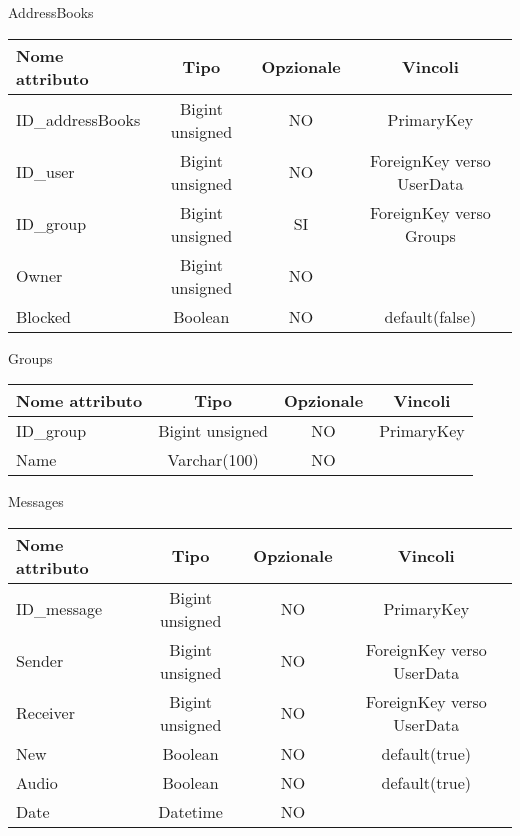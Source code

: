 \begin{center}
AddressBooks

\begin{center}
\begin{tabular}{lccc}
\toprule
Nome attributo & Tipo & Opzionale & Vincoli\\
\midrule
ID\_addressBooks & Bigint unsigned & NO & PrimaryKey\\
ID\_user & Bigint unsigned & NO & ForeignKey verso UserData\\
ID\_group & Bigint unsigned & SI & ForeignKey verso Groups\\
Owner & Bigint unsigned & NO & \\
Blocked & Boolean & NO & default(false)\\
\bottomrule
\end{tabular}
\end{center}

Groups

\begin{center}
\begin{tabular}{lccc}
\toprule
Nome attributo & Tipo & Opzionale & Vincoli\\
\midrule
ID\_group & Bigint unsigned & NO & PrimaryKey\\
Name & Varchar(100) & NO & \\
\bottomrule
\end{tabular}
\end{center}	

Messages

\begin{center}
\begin{tabular}{lccc}
\toprule
Nome attributo & Tipo & Opzionale & Vincoli\\
\midrule
ID\_message & Bigint unsigned & NO & PrimaryKey\\
Sender & Bigint unsigned & NO & ForeignKey verso UserData \\
Receiver & Bigint unsigned & NO & ForeignKey verso UserData\\
New & Boolean & NO & default(true)\\
Audio & Boolean & NO & default(true)\\
Date & Datetime & NO & \\
\bottomrule
\end{tabular}	
\end{center}

\end{center}

